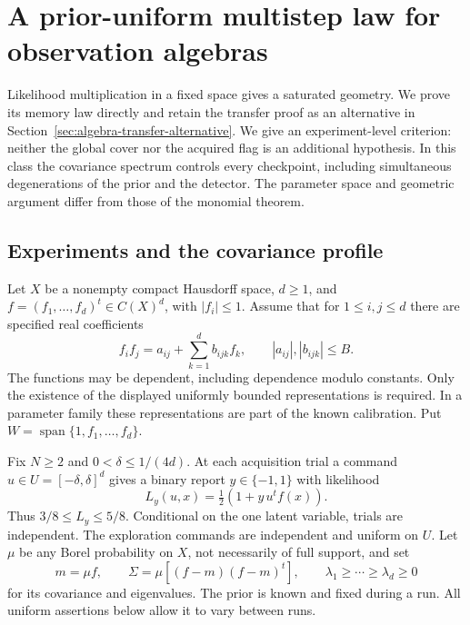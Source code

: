 \section{A prior-uniform multistep law for observation algebras}
\label{sec:algebra-multistep}
Likelihood multiplication in a fixed space gives a saturated geometry.
We prove its memory law directly and retain the transfer proof as an
alternative in Section~\ref{sec:algebra-transfer-alternative}. We give an experiment-level criterion: neither the
global cover nor the acquired flag is an additional hypothesis. In this
class the covariance spectrum controls every checkpoint, including
simultaneous degenerations of the prior and the detector. The parameter
space and geometric argument differ from those of the monomial theorem.

\subsection{Experiments and the covariance profile}
Let $X$ be a nonempty compact Hausdorff space, $d\ge1$, and
$f=(f_1,\ldots,f_d)^t\in C(X)^d$, with $|f_i|\le1$.
Assume that for $1\le i,j\le d$ there are specified real coefficients
\begin{equation}\label{eq:algebra-multiplication}
 f_if_j=a_{ij}+\sum_{k=1}^d b_{ijk}f_k,
 \qquad |a_{ij}|,|b_{ijk}|\le B.
\end{equation}
The functions may be dependent, including dependence modulo constants.
Only the existence of the displayed uniformly bounded representations is
required. In a parameter family these representations are part of the
known calibration. Put $W=\operatorname{span}\{1,f_1,\ldots,f_d\}$.

Fix $N\ge2$ and $0<\delta\le1/(4d)$. At each acquisition trial a
command $u\in U=[-\delta,\delta]^d$ gives a binary report $y\in\{-1,1\}$
with likelihood
\begin{equation}\label{eq:algebra-likelihood}
 L_y(u,x)=\tfrac12(1+y\,u^tf(x)).
\end{equation}
Thus $3/8\le L_y\le5/8$. Conditional on the one latent variable,
trials are independent. The exploration commands are independent and
uniform on $U$. Let $\mu$ be any Borel probability on $X$, not necessarily
of full support, and set
\begin{equation}\label{eq:algebra-covariance}
 m=\mu f,\qquad \Sigma=\mu[(f-m)(f-m)^t],\qquad
 \lambda_1\ge\cdots\ge\lambda_d\ge0
\end{equation}
for its covariance and eigenvalues. The prior is known and fixed during
a run. All uniform assertions below allow it to vary between runs.

